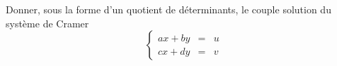 Donner, sous la forme d'un quotient de d\'eterminants, le couple solution du syst\`eme de Cramer
\begin{displaymath}
\left\lbrace \begin{array}{lll}
ax+by & = & u \\ 
cx+dy & = & v
\end{array}\right. 
\end{displaymath} \bigskip\bigskip \bigskip\bigskip